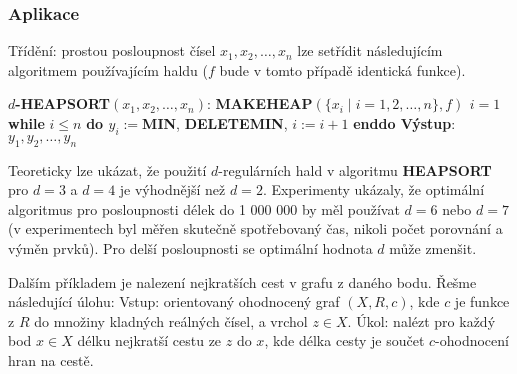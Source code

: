 \documentclass[a4paper,12pt]{article}
\begin{document}
\subsubsection{Aplikace }

Třídění: prostou posloupnost 
čísel $x_1,x_2,\dots,x_n$ lze setřídit následujícím 
algoritmem použí\-vajícím haldu ($f$ bude v tomto případě 
identická funkce).

$d${\bf -HEAPSORT$(x_1,x_2,\dots,x_n)$}:\newline 
{\bf MAKEHEAP$(\{x_i\mid i=1,2,\dots,n\},f)$\newline 
$i=1$\newline 
while} $i\le n$ {\bf do\newline 
\phantom{{\rm ---}}$y_i:=$MIN}, {\bf DELETEMIN}, $i:=i+1$\newline 
{\bf enddo\newline 
Výstup}: $y_1,y_2,\dots,y_n$

Teoreticky lze ukázat, že použití $d$-regulárních hald v 
algoritmu {\bf HEAPSORT} pro $d=3$ a $d=4$ je výhodnější 
než $d=2$. Experimenty ukázaly, že optimální 
algoritmus pro posloupnosti délek do 1 000 000 by měl  
používat $d=6$ nebo $d=7$ (v experimentech byl měřen 
skutečně spotřebovaný čas, nikoli počet porovnání a 
výměn prvků). 
Pro delší posloupnosti se optimální 
hodnota $d$ může zmenšit.

Dalším příkladem je nalezení nejkratších cest v grafu z daného 
bodu. Řešme následující úlohu: \newline 
Vstup: orientovaný ohodnocený graf $(X,R,c)$, kde $c$ je funkce z $
R$ do množiny kladných 
reálných čísel, a vrchol $z\in X$.\newline 
Úkol: nalézt pro každý bod $x\in X$ délku 
nejkratší cestu ze $z$ do $x$, kde délka cesty je součet 
$c$-ohodnocení hran na cestě.
\end{document}
